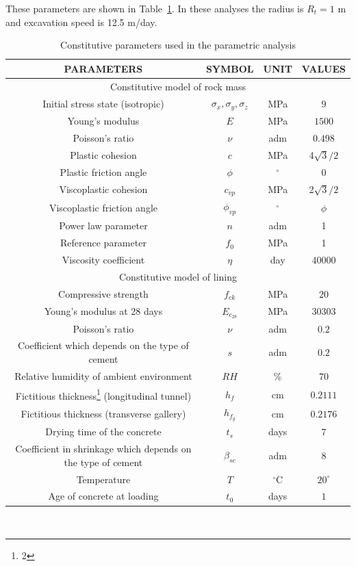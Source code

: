 \documentclass[a4paper,fleqn]{cas-sc}
\begin{document}
These parameters are shown in Table~\ref{table2}. In these analyses the radius is $R_t = 1$ m and excavation speed is 12.5 m/day.
\begin{table}
	\caption{Constitutive parameters used in the parametric analysis}
	\label{table2}
	\centering
	\renewcommand{\arraystretch}{1.25}
	\begin{tabular}{c c c c}
		\hline
		\multicolumn{1}{c}{PARAMETERS} &
		\multicolumn{1}{c}{SYMBOL} &
		\multicolumn{1}{c}{UNIT} &
		\multicolumn{1}{c}{VALUES} \\
		\hline
		\multicolumn{4}{c}{Constitutive model of rock mass} \\
		\hline
		Initial stress state (isotropic) & $\sigma_x, \sigma_y, \sigma_z$ & MPa & $9$ \\
		Young's modulus & $E$ & MPa & $1500$ \\
		Poisson's ratio & $\nu$ & adm & $0.498$ \\
		Plastic cohesion & $c$ & MPa & 4$\sqrt{3}/2$ \\
		Plastic friction angle & $\phi$ & $^{\circ}$ & 0 \\
		Viscoplastic cohesion & $c_{vp}$ & MPa & 2$\sqrt{3}/2$ \\
		Viscoplastic friction angle & $\phi_{vp}$ & $^{\circ}$ & $\phi$ \\
		Power law parameter & $n$ & adm & 1 \\
		Reference parameter & $f_0$ & MPa & 1 \\
		Viscosity coefficient & $\eta$ & day & $40000$ \\
		\hline
		\multicolumn{4}{c}{Constitutive model of lining} \\
		\hline
		
		Compressive strength & $f_{ck}$ & MPa & $20$ \\
		Young's modulus at 28 days & $E_{c_{28}}$ & MPa & $30303$ \\
		Poisson's ratio & $\nu$ & adm & $0.2$ \\
		
		Coefficient which depends on the type of cement & $s$ & adm & $0.2$ \\
		Relative humidity of ambient environment & $RH$ & \% & $70$ \\
		Fictitious thickness\footnote{2} (longitudinal tunnel) & $h_f$ & cm & $0.2111$ \\
		Fictitious thickness (transverse gallery) & $h_{f_g}$ & cm & $0.2176$ \\
		Drying time of the concrete & $t_s$ & days & $7$ \\
		Coefficient in shrinkage which depends on the type of cement & $\beta_{sc}$ & adm & $8$ \\
		Temperature & $T$ & $^\circ$C & $20^\circ$ \\
		Age of concrete at loading & $t_0$ & days & $1$ \\
		\hline
	\end{tabular}
	\normalsize
	\\ 
\end{table}
\end{document}
